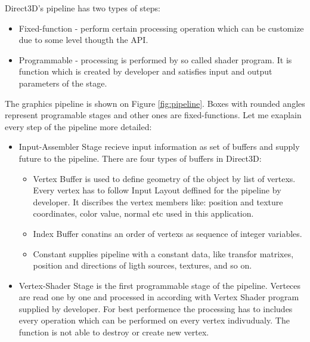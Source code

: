\documentclass[twoside, english, 11pt]{report}
\begin{document}
Direct3D's pipeline has two types of steps:
\begin{itemize}
\item Fixed-function - perform certain processing operation which can be customize due to some level thougth the API.
\item Programmable - processing is performed by so called shader program. It is function which is created by developer and satisfies input and output parameters of the stage.
\end{itemize}

The graphics pipeline is shown on Figure \ref{fig:pipeline}. Boxes with rounded angles represent programable stages and other ones are fixed-functions. Let me exaplain every step of the pipeline more detailed: 

\begin{itemize}
\item Input-Assembler Stage recieve input information as set of buffers and supply future to the pipeline. There are four types of buffers in Direct3D:
  \begin{itemize}
    \item Vertex Buffer is used to define geometry of the object by list of vertexs. Every vertex has to follow Input Layout deffined for the pipeline by developer. It discribes the vertex members like: position and texture coordinates, color value, normal etc used in this application.
    \item Index Buffer conatins an order of vertexs as sequence of integer variables.
    \item Constant supplies pipeline with a constant data, like transfor matrixes, position and directions of ligth sources, textures, and so on.
  \end{itemize}
\item Vertex-Shader Stage is the first programmable stage of the pipeline. Verteces are read one by one and processed in according with Vertex Shader program supplied by developer. For best performence the processing has to includes every operation which can be performed on every vertex indivudualy. The function is not able to destroy or create new vertex.


\end{itemize}
\end{document}
